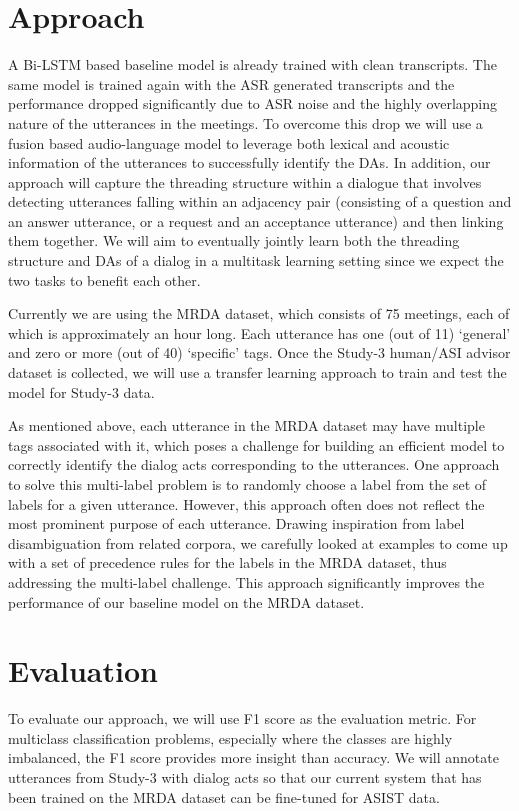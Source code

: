 \section{Approach}

A Bi-LSTM based baseline model is already trained with clean transcripts. The
same model is trained again with the ASR generated transcripts and the
performance dropped significantly due to ASR noise and the highly overlapping
nature of the utterances in the meetings. To overcome this drop we will use a
fusion based audio-language model to leverage both lexical and acoustic
information of the utterances to successfully identify the DAs. In addition,
our approach will capture the threading structure within a dialogue that
involves detecting utterances falling within an adjacency pair (consisting of a
question and an answer utterance, or a request and an acceptance utterance) and
then linking them together. We will aim to eventually jointly learn both the
threading structure and DAs of a dialog in a multitask learning setting since
we expect the two tasks to benefit each other.

Currently we are using the MRDA dataset, which consists of 75 meetings, each of
which is approximately an hour long. Each utterance has one (out of 11)
`general' and zero or more (out of 40) `specific' tags. Once the Study-3
human/ASI advisor dataset is collected, we will use a transfer learning
approach to train and test the model for Study-3 data.

As mentioned above, each utterance in the MRDA dataset may have multiple tags
associated with it, which poses a challenge for building an efficient model to
correctly identify the dialog acts corresponding to the utterances.  One
approach to solve this multi-label problem is to randomly choose a label from
the set of labels for a given utterance. However, this approach often does not
reflect the most prominent purpose of each utterance. Drawing inspiration from
label disambiguation from related corpora, we carefully looked at examples to
come up with a set of precedence rules for the labels in the MRDA dataset, thus
addressing the multi-label challenge. This approach significantly improves the
performance of our baseline model on the MRDA dataset.

\section{Evaluation}

To evaluate our approach, we will use F1 score as the evaluation metric. For
multiclass classification problems, especially where the classes are highly
imbalanced, the F1 score provides more insight than accuracy. We will annotate
utterances from Study-3 with dialog acts so that our current system that has
been trained on the MRDA dataset can be fine-tuned for ASIST data. 

